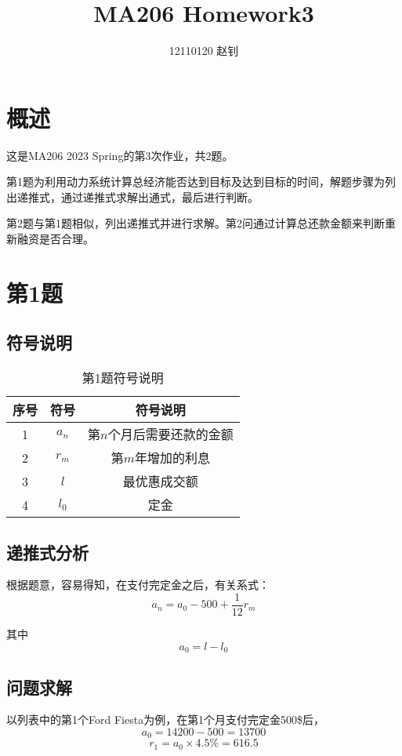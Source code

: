 \documentclass{article}
\title{MA206 Homework3}
\author{12110120 赵钊}
\begin{document}
\maketitle


\section{概述}

这是MA206 2023 Spring的第3次作业，共2题。

第1题为利用动力系统计算总经济能否达到目标及达到目标的时间，解题步骤为列出递推式，通过递推式求解出通式，最后进行判断。

第2题与第1题相似，列出递推式并进行求解。第2问通过计算总还款金额来判断重新融资是否合理。

\section{第1题}

\subsection{符号说明}

\begin{table}[!h]
\begin{center}
\begin{tabular}{|c|c|c|}
    \hline
    序号 & 符号 & 符号说明\\
    \hline
    1 & $a_n$ & 第$n$个月后需要还款的金额\\
    \hline
    2 & $r_m$ & 第$m$年增加的利息\\ 
    \hline
    3 & $l$ & 最优惠成交额\\ 
    \hline
    4 & $l_0$ & 定金\\ 
    \hline
\end{tabular}
\caption{\label{demo-table}第1题符号说明}
\end{center}
\end{table}

\subsection{递推式分析}
根据题意，容易得知，在支付完定金之后，有关系式：
\[a_n = a_0 - 500 + \frac{1}{12}r_m\]

其中
\[a_0 = l - l_0\]

\subsection{问题求解}
以列表中的第1个Ford Fiesta为例，在第1个月支付完定金500\$后，
\[a_0 = 14200 - 500 = 13700\]
\[r_1 = a_0 \times 4.5\% = 616.5\]
\end{document}
